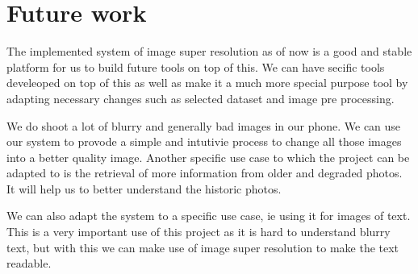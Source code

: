 \chapter{Future work}

The implemented system of image super resolution as of now is a good and stable platform for us to build future tools on top of this. We can have secific tools develeoped on top of this as well as make it a much more special purpose tool by adapting necessary changes such as selected dataset and image pre processing.

We do shoot a lot of blurry and generally bad images in our phone. We can use our system to provode a simple and intutivie process to change all those images into a better quality image. Another specific use case to which the project can be adapted to is the retrieval of more information from older and degraded photos. It will help us to better understand the historic photos.

We can also adapt the system to a specific use case, ie using it for images of text. This is a very important use of this project as it is hard to understand blurry text, but with this we can make use of image super resolution to make the text readable.